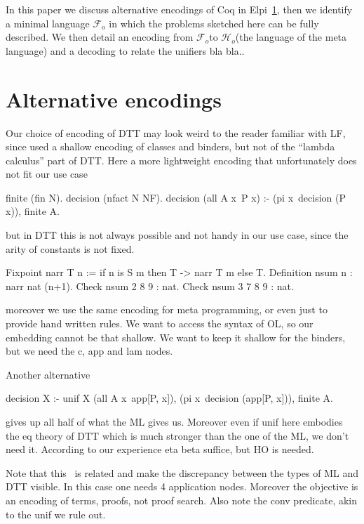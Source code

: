 \documentclass[sigconf,natbib=false]{acmart}
\newcommand{\Fo}{\ensuremath{\mathcal{F}_{\!o}\xspace}}
\newcommand{\Ho}{\ensuremath{\mathcal{H}_o}\xspace}
\begin{document}
In this paper we discuss alternative encodings of Coq in
Elpi~\ref{sec:encodings}, then we identify a minimal language \Fo
in which the problems sketched here can be fully described.
We then detail an encoding  from \Fo to \Ho (the language of
the meta language) and a decoding  to relate the unifiers
bla bla..

\section{Alternative encodings} %
\label{sec:encodings}

Our choice of encoding of DTT may look weird to the reader familiar with
LF, since used a shallow encoding of classes and binders, but not of the
``lambda calculus'' part of DTT. Here a more lightweight encoding
that unfortunately does not fit our use case

\begin{elpicode}
finite (fin N).
decision (nfact N NF).
decision (all A x\ P x) :- 
  (pi x\ decision (P x)), finite A.
\end{elpicode}

but in DTT this is not always possible and not handy in our use case,
since the arity of constants is not fixed.

\begin{coqcode}
Fixpoint narr T n := 
  if n is S m then T -> narr T m else T.
Definition nsum n : narr nat (n+1).
Check nsum 2   8 9 : nat.
Check nsum 3 7 8 9 : nat.
\end{coqcode}
  
moreover we use the same encoding for meta programming, or even just to provide
hand written rules. We want to access the syntax of OL, so our embedding cannot
be that shallow. We want to keep it shallow for the binders, but we need
the c, app and lam nodes. %

Another alternative

\begin{elpicode}
decision X :- unif X (all A x\ app[P, x]), 
  (pi x\ decision (app[P, x])), finite A.
\end{elpicode}

gives up all half of what the ML gives us. Moreover even if unif here embodies
the eq theory of DTT which is much stronger than the one of the ML, we don't need 
it. According to our experience eta beta suffice, but HO is needed.



Note that this~\cite{felty93lics} is related and make the
discrepancy between the types of ML and DTT visible. In this case
one needs 4 application nodes. Moreover the objective is an encoding
of terms, proofs, not proof search. Also note the conv predicate,
akin to the unif we rule out.
\end{document}
